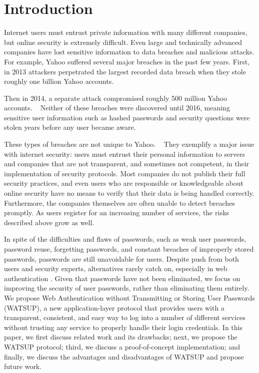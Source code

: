 \section{Introduction}
\label{sec:intro}

Internet users must entrust private information with many different companies, but online security is extremely difficult. Even large and technically advanced companies have lost sensitive information to data breaches and malicious attacks. For example, Yahoo suffered several major breaches in the past few years. First, in 2013 attackers perpetrated the largest recorded data breach when they stole roughly one billion Yahoo accounts. ~\cite{Yahoo_Guardian:2016}

Then in 2014, a separate attack compromised roughly 500 million Yahoo accounts. ~\cite{Yahoo_CNN:2016} Neither of these breaches were discovered until 2016, meaning sensitive user information such as hashed passwords and security questions were stolen years before any user became aware.

These types of breaches are not unique to Yahoo. ~\cite{pwned:2016,offenders:2016} They exemplify a major issue with internet security: users must entrust their personal information to servers and companies that are not transparent, and sometimes not competent, in their implementation of security protocols. Most companies do not publish their full security practices, and even users who are responsible or knowledgeable about online security have no means to verify that their data is being handled correctly. Furthermore, the companies themselves are often unable to detect breaches promptly. As users register for an increasing number of services, the risks described above grow as well.

In spite of the difficulties and flaws of passwords, such as weak user passwords, password reuse, forgetting passwords, and constant breaches of improperly stored passwords, passwords are still unavoidable for users. Despite push from both users and security experts, alternatives rarely catch on, especially in web authentication \cite{microsoft:2011}. Given that passwords have not been eliminated, we focus on improving the security of user passwords, rather than eliminating them entirely.
We propose Web Authentication without Transmitting or Storing User Passwords (WATSUP), a new application-layer protocol that provides users with a transparent, consistent, and easy way to log into a number of different services without trusting any service to properly handle their login credentials. In this paper, we first discuss related work and its drawbacks; next, we propose the WATSUP protocol; third, we discuss a proof-of-concept implementation; and finally, we discuss the advantages and disadvantages of WATSUP and propose future work.
